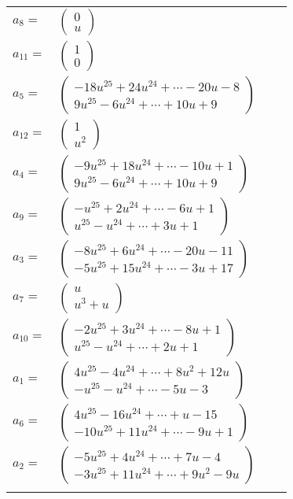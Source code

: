 \documentclass[1p]{elsarticle_modified}
\theoremstyle{definition}
\begin{document}
\begin{tabular}{m{7pt} m{180pt} m{7pt} m{180pt} }
\flushright $a_{8}=$&$\begin{pmatrix}0\\u\end{pmatrix}$ \\
\flushright $a_{11}=$&$\begin{pmatrix}1\\0\end{pmatrix}$ \\
\flushright $a_{5}=$&$\begin{pmatrix}-18 u^{25}+24 u^{24}+\cdots-20 u-8\\9 u^{25}-6 u^{24}+\cdots+10 u+9\end{pmatrix}$ \\
\flushright $a_{12}=$&$\begin{pmatrix}1\\u^2\end{pmatrix}$ \\
\flushright $a_{4}=$&$\begin{pmatrix}-9 u^{25}+18 u^{24}+\cdots-10 u+1\\9 u^{25}-6 u^{24}+\cdots+10 u+9\end{pmatrix}$ \\
\flushright $a_{9}=$&$\begin{pmatrix}- u^{25}+2 u^{24}+\cdots-6 u+1\\u^{25}- u^{24}+\cdots+3 u+1\end{pmatrix}$ \\
\flushright $a_{3}=$&$\begin{pmatrix}-8 u^{25}+6 u^{24}+\cdots-20 u-11\\-5 u^{25}+15 u^{24}+\cdots-3 u+17\end{pmatrix}$ \\
\flushright $a_{7}=$&$\begin{pmatrix}u\\u^3+u\end{pmatrix}$ \\
\flushright $a_{10}=$&$\begin{pmatrix}-2 u^{25}+3 u^{24}+\cdots-8 u+1\\u^{25}- u^{24}+\cdots+2 u+1\end{pmatrix}$ \\
\flushright $a_{1}=$&$\begin{pmatrix}4 u^{25}-4 u^{24}+\cdots+8 u^2+12 u\\- u^{25}- u^{24}+\cdots-5 u-3\end{pmatrix}$ \\
\flushright $a_{6}=$&$\begin{pmatrix}4 u^{25}-16 u^{24}+\cdots+u-15\\-10 u^{25}+11 u^{24}+\cdots-9 u+1\end{pmatrix}$ \\
\flushright $a_{2}=$&$\begin{pmatrix}-5 u^{25}+4 u^{24}+\cdots+7 u-4\\-3 u^{25}+11 u^{24}+\cdots+9 u^2-9 u\end{pmatrix}$\\&\end{tabular}
\end{document}
